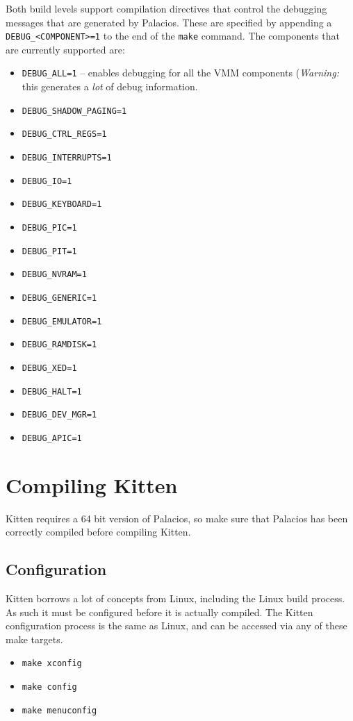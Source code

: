 \documentclass[11pt]{article}
\begin{document}
Both build levels support compilation directives that control the
debugging messages that are generated by Palacios. These are specified
by appending a \verb.DEBUG_<COMPONENT>=1. to the end of the
\verb.make. command. The components that are currently supported are:
\begin{itemize}
\item \verb.DEBUG_ALL=1. -- enables debugging for all the VMM components
({\em Warning:} this generates a {\em lot} of debug information.
\item \verb.DEBUG_SHADOW_PAGING=1.
\item \verb.DEBUG_CTRL_REGS=1.
\item \verb.DEBUG_INTERRUPTS=1.
\item \verb.DEBUG_IO=1.
\item \verb.DEBUG_KEYBOARD=1.
\item \verb.DEBUG_PIC=1.
\item \verb.DEBUG_PIT=1.
\item \verb.DEBUG_NVRAM=1.
\item \verb.DEBUG_GENERIC=1.
\item \verb.DEBUG_EMULATOR=1.
\item \verb.DEBUG_RAMDISK=1.
\item \verb.DEBUG_XED=1.
\item \verb.DEBUG_HALT=1.
\item \verb.DEBUG_DEV_MGR=1.
\item \verb.DEBUG_APIC=1.
\end{itemize}



\section{Compiling Kitten}
Kitten requires a 64 bit version of Palacios, so make sure that
Palacios has been correctly compiled before compiling Kitten.

\subsection{Configuration}
Kitten borrows a lot of concepts from Linux, including the Linux build
process. As such it must be configured before it is actually compiled.
The Kitten configuration process is the same as Linux, and can be
accessed via any of these make targets.
\begin{itemize}
\item \verb.make xconfig.
\item \verb.make config.
\item \verb.make menuconfig.
\end{itemize}
\end{document}
